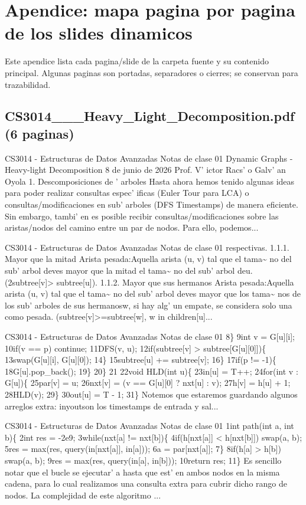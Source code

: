 \clearpage
\section{Apendice: mapa pagina por pagina de los slides dinamicos}
Este apendice lista cada pagina/slide de la carpeta fuente y su contenido principal. Algunas paginas son portadas, separadores o cierres; se conservan para trazabilidad.
\subsection*{CS3014\_\_\_Heavy\_Light\_Decomposition.pdf (6 paginas)}
\begin{description}[leftmargin=!,labelwidth=4.2em,style=nextline]
\item[Pag. 1] CS3014 - Estructuras de Datos Avanzadas Notas de clase 01 Dynamic Graphs - Heavy-light Decomposition 8 de junio de 2026 Prof. V' ictor Racs' o Galv' an Oyola 1. Descomposiciones de ' arboles Hasta ahora hemos tenido algunas ideas para poder realizar consultas espec' ificas (Euler Tour para LCA) o consultas/modificaciones en sub' arboles (DFS Timestamps) de manera eficiente. Sin embargo, tambi' en es posible recibir consultas/modificaciones sobre las aristas/nodos del camino entre un par de nodos. Para ello, podemos...
\item[Pag. 2] CS3014 - Estructuras de Datos Avanzadas Notas de clase 01 respectivas. 1.1.1. Mayor que la mitad Arista pesada:Aquella arista (u, v) tal que el tama\textasciitilde{} no del sub' arbol deves mayor que la mitad el tama\textasciitilde{} no del sub' arbol deu. (2subtree[v]> subtree[u]). 1.1.2. Mayor que sus hermanos Arista pesada:Aquella arista (u, v) tal que el tama\textasciitilde{} no del sub' arbol deves mayor que los tama\textasciitilde{} nos de los sub' arboles de sus hermanosw, si hay alg' un empate, se considera solo una como pesada. (subtree[v]>=subtree[w], w in children[u]...
\item[Pag. 3] CS3014 - Estructuras de Datos Avanzadas Notas de clase 01 8\} 9int v = G[u][i]; 10if(v == p) continue; 11DFS(v, u); 12if(subtree[v] > subtree[G[u][0]])\{ 13swap(G[u][i], G[u][0]); 14\} 15subtree[u] += subtree[v]; 16\} 17if(p != -1)\{ 18G[u].pop\_back(); 19\} 20\} 21 22void HLD(int u)\{ 23in[u] = T++; 24for(int v : G[u])\{ 25par[v] = u; 26nxt[v] = (v == G[u][0] ? nxt[u] : v); 27h[v] = h[u] + 1; 28HLD(v); 29\} 30out[u] = T - 1; 31\} Notemos que estaremos guardando algunos arreglos extra: inyoutson los timestamps de entrada y sal...
\item[Pag. 4] CS3014 - Estructuras de Datos Avanzadas Notas de clase 01 1int path(int a, int b)\{ 2int res = -2e9; 3while(nxt[a] != nxt[b])\{ 4if(h[nxt[a]] < h[nxt[b]]) swap(a, b); 5res = max(res, query(in[nxt[a]], in[a])); 6a = par[nxt[a]]; 7\} 8if(h[a] > h[b]) swap(a, b); 9res = max(res, query(in[a], in[b])); 10return res; 11\} Es sencillo notar que el bucle se ejecutar' a hasta que est' en ambos nodos en la misma cadena, para lo cual realizamos una consulta extra para cubrir dicho rango de nodos. La complejidad de este algoritmo ...

\end{description}
